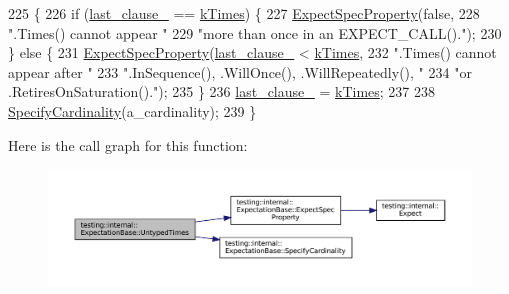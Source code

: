 \begin{DoxyCode}
225                                                                    \{
226   \textcolor{keywordflow}{if} (\hyperlink{classtesting_1_1internal_1_1ExpectationBase_a584f296e53b4cc002ddf5e65e44d72d9}{last\_clause\_} == \hyperlink{classtesting_1_1internal_1_1ExpectationBase_a450f34b979ec5814c91d4eab6b78cfc2a8080d1291dd355e3ad9478f8c8b79689}{kTimes}) \{
227     \hyperlink{classtesting_1_1internal_1_1ExpectationBase_a652adbe3fcca2950175e3859d59af268}{ExpectSpecProperty}(\textcolor{keyword}{false},
228                        \textcolor{stringliteral}{".Times() cannot appear "}
229                        \textcolor{stringliteral}{"more than once in an EXPECT\_CALL()."});
230   \} \textcolor{keywordflow}{else} \{
231     \hyperlink{classtesting_1_1internal_1_1ExpectationBase_a652adbe3fcca2950175e3859d59af268}{ExpectSpecProperty}(\hyperlink{classtesting_1_1internal_1_1ExpectationBase_a584f296e53b4cc002ddf5e65e44d72d9}{last\_clause\_} < \hyperlink{classtesting_1_1internal_1_1ExpectationBase_a450f34b979ec5814c91d4eab6b78cfc2a8080d1291dd355e3ad9478f8c8b79689}{kTimes},
232                        \textcolor{stringliteral}{".Times() cannot appear after "}
233                        \textcolor{stringliteral}{".InSequence(), .WillOnce(), .WillRepeatedly(), "}
234                        \textcolor{stringliteral}{"or .RetiresOnSaturation()."});
235   \}
236   \hyperlink{classtesting_1_1internal_1_1ExpectationBase_a584f296e53b4cc002ddf5e65e44d72d9}{last\_clause\_} = \hyperlink{classtesting_1_1internal_1_1ExpectationBase_a450f34b979ec5814c91d4eab6b78cfc2a8080d1291dd355e3ad9478f8c8b79689}{kTimes};
237 
238   \hyperlink{classtesting_1_1internal_1_1ExpectationBase_a3d1d08542b32239d9b5738e3e32e2217}{SpecifyCardinality}(a\_cardinality);
239 \}
\end{DoxyCode}
Here is the call graph for this function\+:
\nopagebreak
\begin{figure}[H]
\begin{center}
\leavevmode
\includegraphics[width=350pt]{classtesting_1_1internal_1_1ExpectationBase_a05bbd7fea6ea3c740ea095ea7462bc07_cgraph}
\end{center}
\end{figure}
